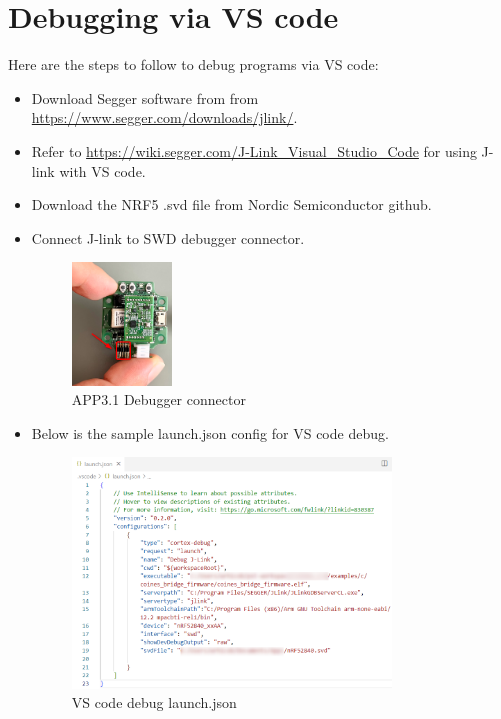 \documentclass{article}
\begin{document}
\section{Debugging via VS code}
Here are the steps to follow to debug programs via VS code:
\begin{itemize}
	\item Download Segger software from from \url{https://www.segger.com/downloads/jlink/}.
	\item Refer to \url{https://wiki.segger.com/J-Link_Visual_Studio_Code} for using J-link with VS code.
	\item Download the NRF5 .svd file from Nordic Semiconductor github.
	\item Connect J-link to SWD debugger connector.
	\begin{figure}[H]
		\begin{center}
			\includegraphics[width=0.25\textwidth]{coinesAPI_images/App31_jlink_connection.png}
			\caption{APP3.1 Debugger connector}
		\end{center}
	\end{figure}
	\item Below is the sample launch.json config for VS code debug.
	\begin{figure}[H]
		\begin{center}
			\includegraphics[width=0.8\textwidth]{coinesAPI_images/Debug_launch_json.png}
			\caption{VS code debug launch.json}
		\end{center}
	\end{figure}
\end{itemize}

\newpage
\end{document}
